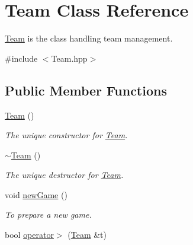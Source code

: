 \hypertarget{classTeam}{\section{\-Team \-Class \-Reference}
\label{classTeam}
}


\hyperlink{classTeam}{\-Team} is the class handling team management.  




{\ttfamily \#include $<$\-Team.\-hpp$>$}

\subsection*{\-Public \-Member \-Functions}
\begin{DoxyCompactItemize}
\item 
\hypertarget{classTeam_aada295895b747960576b69d8c87a54ba}{\hyperlink{classTeam_aada295895b747960576b69d8c87a54ba}{\-Team} ()}\label{classTeam_aada295895b747960576b69d8c87a54ba}

\begin{DoxyCompactList}\small\item\em \-The unique constructor for \hyperlink{classTeam}{\-Team}. \end{DoxyCompactList}\item 
\hypertarget{classTeam_ab4218fddd612d52bab47bec4feeb49de}{\hyperlink{classTeam_ab4218fddd612d52bab47bec4feeb49de}{$\sim$\-Team} ()}\label{classTeam_ab4218fddd612d52bab47bec4feeb49de}

\begin{DoxyCompactList}\small\item\em \-The unique destructor for \hyperlink{classTeam}{\-Team}. \end{DoxyCompactList}\item 
\hypertarget{classTeam_af7fdc812a83e0e8c0bb24bc1c50b30ca}{void \hyperlink{classTeam_af7fdc812a83e0e8c0bb24bc1c50b30ca}{new\-Game} ()}\label{classTeam_af7fdc812a83e0e8c0bb24bc1c50b30ca}

\begin{DoxyCompactList}\small\item\em \-To prepare a new game. \end{DoxyCompactList}\item 
\hypertarget{classTeam_a44bbbb20e623b2f340377295f6a5b391}{bool \hyperlink{classTeam_a44bbbb20e623b2f340377295f6a5b391}{operator$>$} (\hyperlink{classTeam}{\-Team} \&t)}\label{classTeam_a44bbbb20e623b2f340377295f6a5b391}


\end{DoxyCompactItemize}
